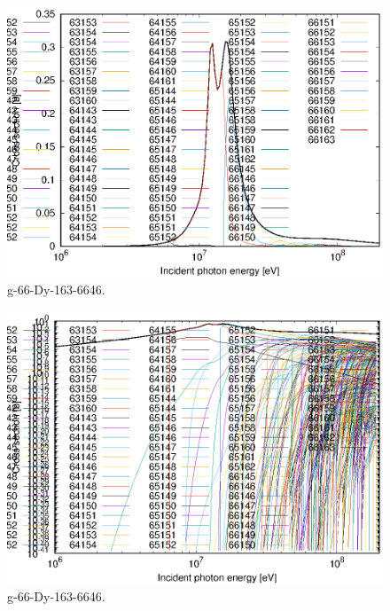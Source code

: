 \begin{figure}
 \includegraphics[width=\linewidth]{eps/g_66-Dy-163_6646.eps}
  \caption{g-66-Dy-163-6646.}
\end{figure}
\begin{figure}
 \includegraphics[width=\linewidth]{eps-log/g_66-Dy-163_6646.eps}
 \caption{g-66-Dy-163-6646.}
\end{figure}
\newpage \clearpage

